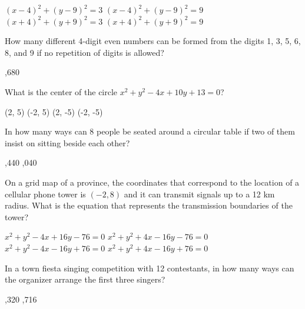 \begin{questions}
\begin{multicols}{2}
\begin{choices}  
\choice $(x-4)^2 + (y-9)^2 = 3$ 
\CorrectChoice $(x-4)^2 + (y-9)^2 = 9$ 
\choice $(x+4)^2 + (y+9)^2 = 3$
\choice $(x+4)^2 + (y+9)^2 = 9$ 
\end{choices}
\end{multicols} 

\question How many  different  4-digit  even  numbers can  be  formed  from  the  digits 1,  3,  5,  6,  8,  and  9  if  no  repetition  of  digits  is allowed? 
\begin{multicols}{4}
\begin{choices}  
,680
\end{choices}
\end{multicols} 

\question What is the center of the circle $x^2 + y^2 - 4x + 10y + 13 = 0$?

\begin{multicols}{4}
\begin{choices}  
\choice (2, 5)
\choice (-2, 5)
\CorrectChoice (2, -5)
\choice (-2, -5)
\end{choices}
\end{multicols} 

\question In how many ways can 8  people  be  seated  around  a  circular  table  if two  of  them  insist  on  sitting  beside  each  other? 
\begin{multicols}{4}
\begin{choices} 
,440
,040
\end{choices}
\end{multicols} 

\question On a grid map of a province, the coordinates that correspond to the
location of a cellular phone tower is $(-2, 8)$ and it can transmit signals
up to a 12 km radius. What is the equation that represents the transmission boundaries of the tower?

\begin{multicols}{2}
\begin{choices}  
\choice $x^2 + y^2 - 4x + 16y - 76 = 0$ 
\CorrectChoice $x^2 + y^2 + 4x - 16y - 76 = 0$ 
\choice $x^2 + y^2 - 4x - 16y + 76 = 0$ 
\choice $x^2 + y^2 + 4x - 16y + 76 = 0$ 
\end{choices}
\end{multicols} 

\question In a town fiesta singing competition with 12 contestants, in how many ways can the organizer arrange the first three singers? 
\begin{multicols}{4}
\begin{choices}  
,320
,716
\end{choices}
\end{multicols}


\end{questions}
